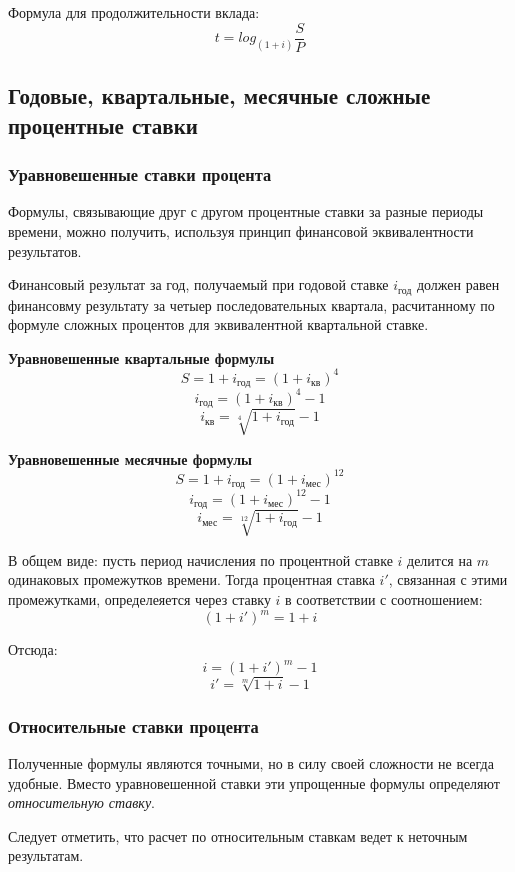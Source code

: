 \documentclass[aps,%
12pt,%
final,%
oneside,
onecolumn,%
musixtex, %
superscriptaddress,%
centertags]{article} %
\theoremstyle{plain}
\theoremstyle{definition}
\theoremstyle{remark}
\begin{document}
Формула для продолжительности вклада: $$ t=log_{(1+i)} \frac{S}{P}$$


\subsection{Годовые, квартальные, месячные сложные процентные ставки }

\subsubsection{Уравновешенные ставки процента}

Формулы, связывающие друг с другом процентные ставки за разные периоды времени, можно получить, используя принцип финансовой эквивалентности результатов.

Финансовый результат за год, получаемый при годовой ставке $i_{\text{год}}$ должен равен финансовму результату за четыер последовательных квартала, расчитанному по формуле сложных процентов для эквивалентной квартальной ставке.

\textbf{Уравновешенные квартальные формулы}
$$S = 1 + i_{\text{год}} = (1+i_{\text{кв}})^4$$
$$i_{\text{год}} = (1+i_{\text{кв}})^4 - 1$$
$$i_{\text{кв}} = \sqrt[4]{1 + i_{\text{год}}} - 1$$

\textbf{Уравновешенные месячные формулы}
$$S = 1 + i_{\text{год}} = (1+i_{\text{мес}})^{12}$$
$$i_{\text{год}} = (1+i_{\text{мес}})^{12} - 1$$
$$i_{\text{мес}} = \sqrt[12]{1 + i_{\text{год}}} - 1$$

В общем виде: пусть период начисления по процентной ставке $i$ делится на $m$ одинаковых промежутков времени. Тогда процентная ставка $i'$, связанная с этими промежутками, определеяется через ставку $i$ в соответствии с соотношением:
$$(1+i')^m = 1+i$$

Отсюда:
$$i = (1+i')^m -1$$
$$i' = \sqrt[m]{1+i} - 1$$

\subsubsection{Относительные ставки процента}

Полученные формулы являются точными, но в силу своей сложности не всегда удобные. Вместо уравновешенной ставки эти упрощенные формулы определяют \textit{относительную ставку}.

Следует отметить, что расчет по относительным ставкам ведет к неточным результатам. 
\end{document}
